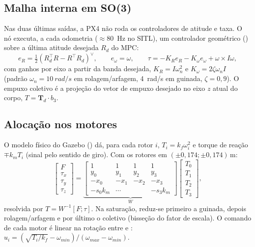 \subsection{Malha interna em SO(3)}
Nas duas últimas saídas, a PX4 não roda os controladores de atitude e taxa.
O nó  executa, a cada odometria ($\approx$\SI{80}{Hz} no SITL),
um controlador geométrico \cite{lee2010geometric}
() sobre a última atitude desejada $R_d$ do MPC:
\begin{equation}
  e_R=\tfrac12\left(R_d^\top R-R^\top R_d\right)^\vee,\qquad
  e_\omega=\omega,\qquad
  \tau=-K_R e_R-K_\omega e_\omega+\omega\times I\omega,
\end{equation}
com ganhos por eixo a partir da banda desejada, $K_R=I\omega_n^2$ e
$K_\omega=2\zeta\omega_n I$ (padrão $\omega_n=\SI{10}{rad/s}$ em rolagem/arfagem,
\SI{4}{rad/s} em guinada, $\zeta=0{,}9$). O empuxo coletivo é a projeção do vetor de empuxo
desejado no eixo $z$ atual do corpo, $T=\mathbf{T}_d\cdot b_3$.

\subsection{Alocação nos motores}
O modelo físico do Gazebo () dá, para cada rotor $i$,
$T_i=k_f\omega_i^2$ e torque de reação $\mp k_m T_i$ (sinal pelo sentido de giro). Com os
rotores em $(\pm0{,}174;\pm0{,}174)$\,m:
\begin{equation}
  \begin{bmatrix}F\\ \tau_x\\ \tau_y\\ \tau_z\end{bmatrix}
  = \underbrace{\begin{bmatrix}
      1&1&1&1\\ y_0&y_1&y_2&y_3\\ -x_0&-x_1&-x_2&-x_3\\ -s_0k_m&\cdots&&-s_3k_m
    \end{bmatrix}}_{W}
  \begin{bmatrix}T_0\\T_1\\T_2\\T_3\end{bmatrix},
\end{equation}
resolvida por $T=W^{-1}[F;\tau]$. Na saturação, reduz-se primeiro a guinada, depois
rolagem/arfagem e por último o coletivo (bisseção do fator de escala). O comando de cada
motor é linear na rotação entre  e :
$u_i=(\sqrt{T_i/k_f}-\omega_{min})/(\omega_{max}-\omega_{min})$.

